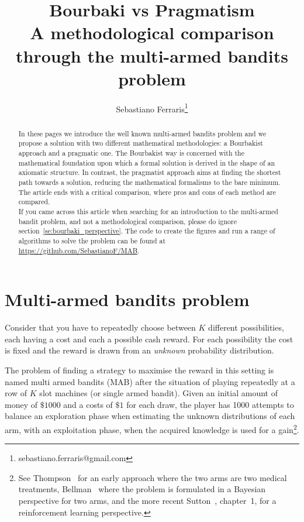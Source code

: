 \documentclass[]{scrartcl}
\title{Bourbaki vs Pragmatism \\ A methodological comparison through the multi-armed bandits problem}
\author{Sebastiano Ferraris\footnote{sebastiano.ferraris@gmail.com}}
\theoremstyle{definition}
\begin{document}
\maketitle

\begin{abstract}
In these pages we introduce the well known multi-armed bandits problem and we propose a solution with two different mathematical methodologies: a Bourbakist approach and a pragmatic one. The Bourbakist way is concerned with the mathematical foundation upon which a formal solution is derived in the shape of an axiomatic structure. In contrast, the pragmatist approach aims at finding the shortest path towards a solution, reducing the mathematical formalisms to the bare minimum.
The article ends with a critical comparison, where pros and cons of each method are compared. \\

\noindent
If you came across this article when searching for an introduction to the multi-armed bandit problem, and not a methodological comparison, please do ignore section~\ref{se:bourbaki_perspective}. The code to create the figures and run a range of algorithms to solve the problem can be found at \href{https://github.com/SebastianoF/multi-armed-bandits-testbed}{https://github.com/SebastianoF/MAB}. 
\end{abstract}


\section{Multi-armed bandits problem}
\label{se:intro}
Consider that you have to repeatedly choose between $K$ different possibilities, each having a cost and each a possible cash reward. For each possibility the cost is fixed and the reward is drawn from an \emph{unknown} probability distribution.

The problem of finding a strategy to maximise the reward in this setting is named multi armed bandits (MAB) after the situation of playing repeatedly at a row of $K$ slot machines (or single armed bandit). Given an initial amount of money of $\$1000$ and a costs of $\$1$ for each draw, the player has 1000 attempts to balance an exploration phase when estimating the unknown distributions of each arm, with an exploitation phase, when the acquired knowledge is used for a gain\footnote{See Thompson~\cite{thompson1933likelihood} for an early approach where the two arms are two medical treatments, Bellman~\cite{bellman1956problem} where the problem is formulated in a Bayesian perspective for two arms, and the more recent Sutton~\cite{sutton2018reinforcement}, chapter~1, for a reinforcement learning perspective.}.
\end{document}
